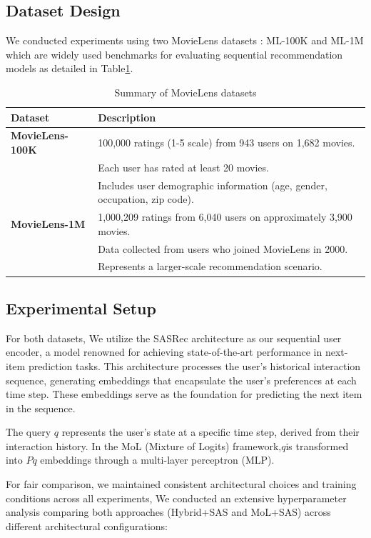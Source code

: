 \subsection{Dataset Design}
We conducted experiments using two MovieLens datasets : ML-100K and ML-1M \citep{Harper2015}which are widely used benchmarks for evaluating sequential recommendation models as detailed in Table\ref{tab_movielens}.\\
\begin{table}[h]
	\centering
	\renewcommand{\arraystretch}{1.2}
	\begin{tabular}{|l|p{10cm}|}
		\hline
		\textbf{Dataset} & \textbf{Description} \\
		\hline
		\textbf{MovieLens-100K} & 100,000 ratings (1-5 scale) from 943 users on 1,682 movies. \\
		& Each user has rated at least 20 movies. \\
		& Includes user demographic information (age, gender, occupation, zip code). \\
		\hline
		\textbf{MovieLens-1M} & 1,000,209 ratings from 6,040 users on approximately 3,900 movies. \\
		& Data collected from users who joined MovieLens in 2000. \\
		& Represents a larger-scale recommendation scenario. \\
		\hline
	\end{tabular}
	\caption{Summary of MovieLens datasets}
	\label{tab_movielens}
\end{table}

\subsection{Experimental Setup }
For both datasets, We utilize the SASRec architecture as our sequential user encoder, a model renowned for achieving state-of-the-art performance in next-item prediction tasks. This architecture processes the user's historical interaction sequence, generating embeddings that encapsulate the user's preferences at each time step. These embeddings serve as the foundation for predicting the next item in the sequence.

The query \( q \) represents the user's state at a specific time step, derived from their interaction history. In the MoL (Mixture of Logits) framework,\( q \)is transformed into \( Pq \)
embeddings through a multi-layer perceptron (MLP).

For fair comparison, we maintained consistent architectural choices and training conditions across all experiments, We conducted an extensive hyperparameter analysis comparing both approaches (Hybrid+SAS and MoL+SAS) across different architectural configurations:
